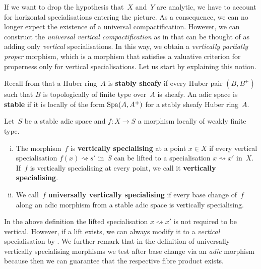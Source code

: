 If we want to drop the hypothesis that~$X$ and~$Y$ are analytic, we have to account for horizontal specialisations entering the picture.
As a consequence, we can no longer expect the existence of a universal compactification.
However, we can construct the \emph{universal vertical compactification} as in \cite{Solodov-vertical-compactification} that can be thought of as adding only \emph{vertical} specialisations.
In this way, we obtain a \emph{vertically partially proper} morphism, which is a morphism that satisfies a valuative criterion for properness only for vertical specialisations.
Let us start by explaining this notion.

Recall from \cite[Definitions~8.26 and~8.54]{Wedhorn-adicspaces} that a Huber ring~$A$ is {\bf stably sheafy} if every Huber pair $(B,B^+)$ such that $B$ is topologically of finite type over~$A$ is sheafy.
An adic space is {\bf stable} if it is locally of the form $\operatorname{Spa}(A,A^+)$ for a stably sheafy Huber ring~$A$.

\begin{defi}
    Let~$S$ be a stable adic space and $f \colon X \to S$ a morphism locally of weakly finite type. 
    \begin{enumerate}[(i)]
        \item The morphism~$f$ is {\bf vertically specialising} at a point $x \in X$ if every vertical specialisation $f(x) \rightsquigarrow s'$ in~$S$ can be lifted to a specialisation $x \rightsquigarrow x'$ in~$X$.
        If~$f$ is vertically specialising at every point, we call it {\bf vertically specialising}.
        \item We call~$f$ {\bf universally vertically specialising} if every base change of~$f$ along an adic  morphism from a stable adic space is vertically specialising.
    \end{enumerate}
\end{defi}

In the above definition the lifted specialisation $x \rightsquigarrow x'$ is not required to be vertical.
However, if a lift exists, we can always modify it to a \emph{vertical} specialisation by \cite[Proposition~3.4]{Solodov-vertical-compactification}.
We further remark that in the definition of universally vertically specialising morphisms we test after base change via an \emph{adic} morphism because then we can guarantee that the respective fibre product exists.

